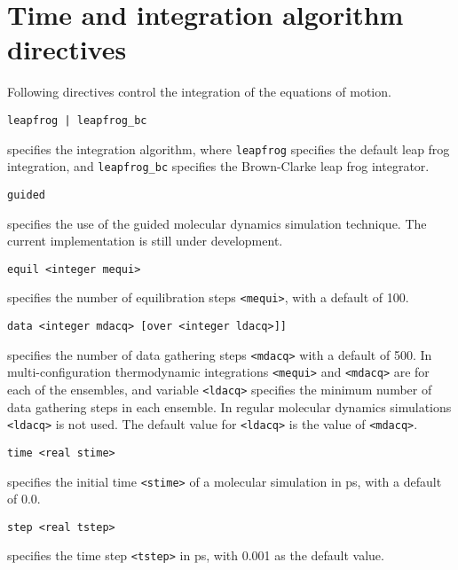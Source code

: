 \section{Time and integration algorithm directives}
Following directives control the integration of the equations of motion.
\begin{description}

\item
\begin{verbatim}
leapfrog | leapfrog_bc
\end{verbatim}
specifies the integration algorithm,
where {\tt leapfrog} specifies the default leap frog integration, and
{\tt leapfrog\_bc} specifies the Brown-Clarke leap frog integrator.

\item
\begin{verbatim}
guided
\end{verbatim}
specifies the use of the guided molecular dynamics simulation
technique. The current implementation is still under development.

\item
\begin{verbatim}
equil <integer mequi>
\end{verbatim}
specifies the number of equilibration steps \verb+<mequi>+, with a default
of 100.

\item
\begin{verbatim}
data <integer mdacq> [over <integer ldacq>]]
\end{verbatim}
specifies the number of data gathering steps \verb+<mdacq>+ with a
default of 500. In multi-configuration thermodynamic integrations
\verb+<mequi>+ and \verb+<mdacq>+ are for each of the ensembles, and
variable \verb+<ldacq>+ specifies the minimum number of data gathering steps 
in each ensemble. In regular molecular dynamics simulations \verb+<ldacq>+
is not used. The default value for \verb+<ldacq>+ is the value of \verb+<mdacq>+.

\item
\begin{verbatim}
time <real stime>
\end{verbatim}
specifies the initial time \verb+<stime>+ of a molecular simulation in ps,
with a default of 0.0.

\item
\begin{verbatim}
step <real tstep>
\end{verbatim}
specifies the time step \verb+<tstep>+ in ps, with 0.001 as the default value.
\end{description}

